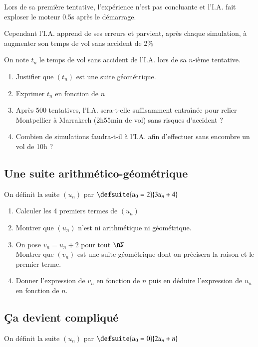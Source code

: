 \documentclass[oneside,12pt]{article}          %
\begin{document}
Lors de sa première tentative, l'expérience n'est pas concluante et l'I.A. fait exploser le moteur 0.5s après le démarrage.

Cependant l'I.A. apprend de ses erreurs et parvient, après chaque simulation, à augmenter son temps de vol sans accident de 2\%

On note $t_n$ le temps de vol sans accident de l'I.A. lors de sa $n$-ième tentative.

\begin{enumerate}
    \item Justifier que $(t_n)$ est une suite géométrique.
    \item Exprimer $t_n$ en fonction de $n$
    \item Après 500 tentatives, l'I.A. sera-t-elle suffisamment entraînée pour relier Montpellier à Marrakech (2h55min de vol) sans risques d'accident ?
    \item[\faCalculator] Combien de simulations faudra-t-il à l'I.A. afin d'effectuer sans encombre un vol de 10h ? 
\end{enumerate}



\subsection{Une suite arithmético-géométrique}
On définit la suite $(u_n)$ par $\defsuite{u_{0}=2}{3u_n+4}$
\begin{enumerate}
    \item Calculer les 4 premiers termes de $(u_n)$
    \item Montrer que $(u_n)$ n'est ni arithmétique ni géométrique.
    \item On pose $v_{n}=u_n+2$ pour tout $\nN$ \\
    Montrer que $(v_{n})$ est une suite géométrique dont on précisera la raison et le premier terme.
    \item Donner l'expression de $v_{n}$ en fonction de $n$ puis en déduire l'expression de $u_n$ en fonction de $n$.
\end{enumerate}



\subsection{Ça devient compliqué}
On définit la suite $(u_n)$ par $\defsuite{u_0=0}{2u_n+n}$
\end{document}
